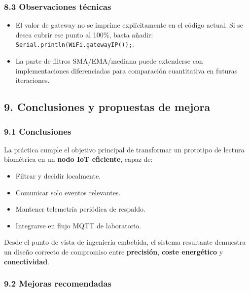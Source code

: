 \documentclass[11pt]{article}
\providecommand{\tightlist}{%
      \setlength{\itemsep}{0pt}\setlength{\parskip}{0pt}}
\begin{document}
\subsubsection{8.3 Observaciones
técnicas}\label{observaciones-tuxe9cnicas}

\begin{itemize}
\tightlist
\item
  El valor de gateway no se imprime explícitamente en el código actual.
  Si se desea cubrir ese punto al 100\%, basta añadir:
  \texttt{Serial.println(WiFi.gatewayIP());}.
\item
  La parte de filtros SMA/EMA/mediana puede extenderse con
  implementaciones diferenciadas para comparación cuantitativa en
  futuras iteraciones.
\end{itemize}

\subsection{9. Conclusiones y propuestas de
mejora}\label{conclusiones-y-propuestas-de-mejora}

\subsubsection{9.1 Conclusiones}\label{conclusiones}

La práctica cumple el objetivo principal de transformar un prototipo de
lectura biométrica en un \textbf{nodo IoT eficiente}, capaz de:

\begin{itemize}
\tightlist
\item
  Filtrar y decidir localmente.
\item
  Comunicar solo eventos relevantes.
\item
  Mantener telemetría periódica de respaldo.
\item
  Integrarse en flujo MQTT de laboratorio.
\end{itemize}

Desde el punto de vista de ingeniería embebida, el sistema resultante
demuestra un diseño correcto de compromiso entre \textbf{precisión},
\textbf{coste energético} y \textbf{conectividad}.

\subsubsection{9.2 Mejoras recomendadas}\label{mejoras-recomendadas}
\end{document}
